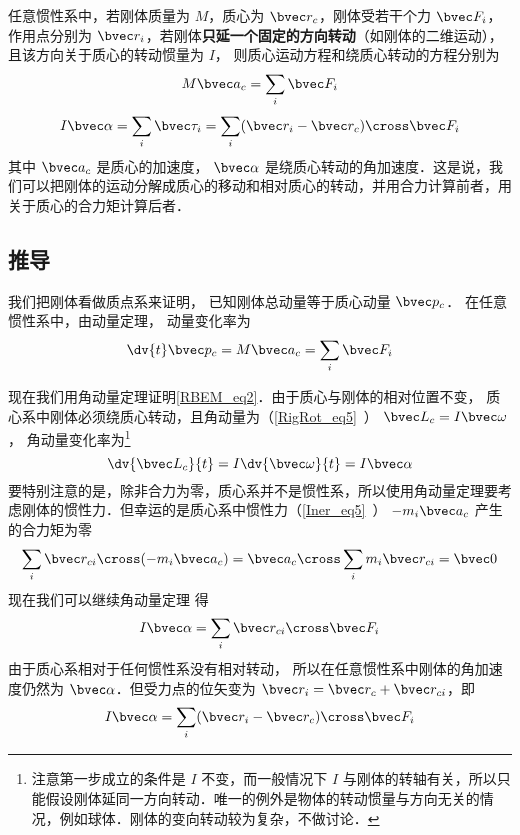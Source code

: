 

任意惯性系中，若刚体质量为 $M$，质心为 $\bvec r_c$，刚体受若干个力 $\bvec F_i$，作用点分别为 $\bvec r_i$，若刚体\textbf{只延一个固定的方向转动}（如刚体的二维运动），且该方向关于质心的转动惯量为 $I$， 则质心运动方程和绕质心转动的方程分别为
\begin{equation}\label{RBEM_eq1}
M\bvec a_c = \sum_i \bvec F_i
\end{equation}
\begin{equation}\label{RBEM_eq2}
I \bvec \alpha = \sum_i \bvec \tau_i = \sum_i (\bvec r_i-\bvec r_c) \cross  \bvec F_i
\end{equation}
其中 $\bvec a_c$ 是质心的加速度， $\bvec \alpha$ 是绕质心转动的角加速度．这是说，我们可以把刚体的运动分解成质心的移动和相对质心的转动，并用合力计算前者，用关于质心的合力矩计算后者．

\subsection{推导}
我们把刚体看做质点系来证明， 已知刚体总动量等于质心动量 $\bvec p_c$． 在任意惯性系中，由动量定理， 动量变化率为
\begin{equation}
\dv{t} \bvec p_c = M \bvec a_c = \sum_i \bvec F_i
\end{equation}

现在我们用角动量定理证明\autoref{RBEM_eq2}．由于质心与刚体的相对位置不变，%
质心系中刚体必须绕质心转动，且角动量为（\autoref{RigRot_eq5}~） $\bvec L_c = I \bvec\omega$， 角动量变化率为\footnote{注意第一步成立的条件是 $I$ 不变，而一般情况下 $I$ 与刚体的转轴有关，所以只能假设刚体延同一方向转动．唯一的例外是物体的转动惯量与方向无关的情况，例如球体．刚体的变向转动较为复杂，不做讨论．}
\begin{equation}
\dv{\bvec L_c}{t} = I \dv{\bvec \omega}{t} = I \bvec\alpha
\end{equation}
要特别注意的是，除非合力为零，质心系并不是惯性系，所以使用角动量定理要考虑刚体的惯性力．但幸运的是质心系中惯性力（\autoref{Iner_eq5}~） $-m_i \bvec a_c$ 产生的合力矩为零
\begin{equation}
\sum_i \bvec r_{ci}\cross (-m_i \bvec a_{c}) = \bvec a_{c} \cross \sum_i m_i \bvec r_{ci} = \bvec 0
\end{equation}
现在我们可以继续角动量定理 得
\begin{equation}
I \bvec\alpha = \sum_i \bvec r_{ci} \cross  \bvec F_i
\end{equation}
由于质心系相对于任何惯性系没有相对转动， 所以在任意惯性系中刚体的角加速度仍然为 $\bvec\alpha$．但受力点的位矢变为 $\bvec r_i = \bvec r_c + \bvec r_{ci}$，即
\begin{equation}\label{RBEM_eq7}
I \bvec \alpha = \sum_i (\bvec r_i-\bvec r_c) \cross  \bvec F_i
\end{equation}

